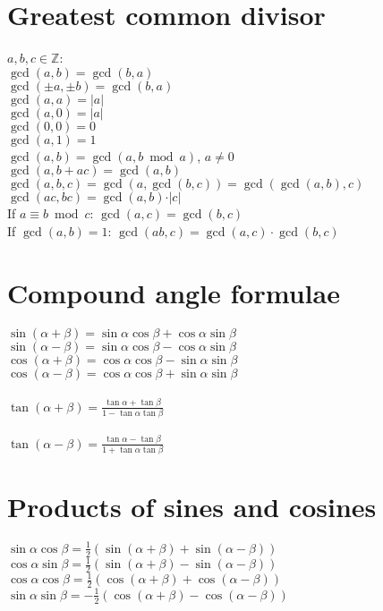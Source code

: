 \documentclass[a4paper, 10pt]{scrartcl}
\begin{document}
\section*{Greatest common divisor}
$a, b, c\in \mathbb{Z}$:\\
$\gcd(a, b) = \gcd(b, a)$\\
$\gcd(\pm a, \pm b) = \gcd(b, a)$\\
$\gcd(a, a) = \vert a\vert$\\
$\gcd(a, 0) = \vert a\vert$\\
$\gcd(0, 0) = 0$\\
$\gcd(a, 1) = 1$\\
$\gcd(a, b) = \gcd(a, b\bmod a)$, $a\neq 0$\\
$\gcd(a, b + ac) = \gcd(a, b)$\\
$\gcd(a, b, c) = \gcd(a, \gcd(b, c)) = \gcd(\gcd(a, b), c)$\\
$\gcd(ac, bc) = \gcd(a, b)\cdot\vert c\vert$\\
If $a\equiv b\bmod c$: $\gcd(a, c) = \gcd(b, c)$\\
If $\gcd(a, b) = 1$: $\gcd(ab, c) = \gcd(a, c)\cdot\gcd(b, c)$\\

\section*{Compound angle formulae}
$\sin{(\alpha + \beta)} = \sin{\alpha}\cos{\beta} + \cos{\alpha}\sin{\beta}$\\
$\sin{(\alpha - \beta)} = \sin{\alpha}\cos{\beta} - \cos{\alpha}\sin{\beta}$\\
$\cos{(\alpha + \beta)} = \cos{\alpha}\cos{\beta} - \sin{\alpha}\sin{\beta}$\\
$\cos{(\alpha - \beta)} = \cos{\alpha}\cos{\beta} + \sin{\alpha}\sin{\beta}$\\\\
$\tan{(\alpha + \beta)} = \frac{\tan{\alpha} + \tan{\beta}}{1 - \tan{\alpha}\tan{\beta}}$\\\\
$\tan{(\alpha - \beta)} = \frac{\tan{\alpha} - \tan{\beta}}{1 + \tan{\alpha}\tan{\beta}}$\\

\section*{Products of sines and cosines}
$\sin{\alpha}\cos{\beta} = \frac{1}{2}(\sin{(\alpha + \beta)} + \sin{(\alpha - \beta)})$\\
$\cos{\alpha}\sin{\beta} = \frac{1}{2}(\sin{(\alpha + \beta)} - \sin{(\alpha - \beta)})$\\
$\cos{\alpha}\cos{\beta} = \frac{1}{2}(\cos{(\alpha + \beta)} + \cos{(\alpha - \beta)})$\\
$\sin{\alpha}\sin{\beta} = -\frac{1}{2}(\cos{(\alpha + \beta)} - \cos{(\alpha - \beta)})$\\
\end{document}
